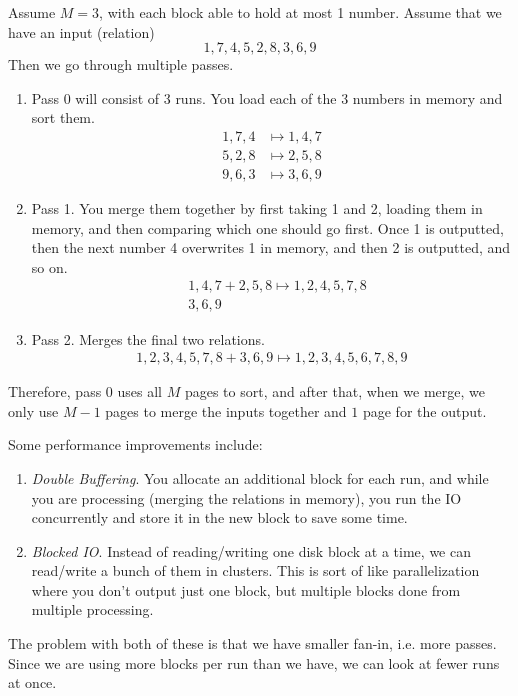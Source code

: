     \begin{example}
      \label{ex:baby-merge}
      Assume $M = 3$, with each block able to hold at most 1 number. Assume that we have an input (relation) 
      \begin{equation}
        1, 7, 4, 5, 2, 8, 3, 6, 9
      \end{equation}
      Then we go through multiple passes. 
      \begin{enumerate}
        \item Pass 0 will consist of 3 runs. You load each of the 3 numbers in memory and sort them.  
          \begin{align}
            1, 7, 4 & \mapsto 1, 4, 7 \\ 
            5, 2, 8 & \mapsto 2, 5, 8 \\ 
            9, 6, 3 & \mapsto 3, 6, 9
          \end{align}

        \item Pass 1. You merge them together by first taking 1 and 2, loading them in memory, and then comparing which one should go first. Once 1 is outputted, then the next number 4 overwrites 1 in memory, and then 2 is outputted, and so on. 
          \begin{align}
            & 1, 4, 7 + 2, 5, 8 \mapsto 1, 2, 4, 5, 7, 8 \\ 
            & 3, 6, 9
          \end{align}

        \item Pass 2. Merges the final two relations. 
          \begin{align}
            1, 2, 3, 4, 5, 7, 8 + 3, 6, 9 \mapsto 1, 2, 3, 4, 5, 6, 7, 8, 9
          \end{align}
      \end{enumerate}
      Therefore, pass 0 uses all $M$ pages to sort, and after that, when we merge, we only use $M-1$ pages to merge the inputs together and $1$ page for the output. 
    \end{example}

    Some performance improvements include: 
    \begin{enumerate}
      \item \textit{Double Buffering}. You allocate an additional block for each run, and while you are processing (merging the relations in memory), you run the IO concurrently and store it in the new block to save some time. 
      \item \textit{Blocked IO}. Instead of reading/writing one disk block at a time, we can read/write a bunch of them in clusters. This is sort of like parallelization where you don't output just one block, but multiple blocks done from multiple processing. 
    \end{enumerate}
    The problem with both of these is that we have smaller fan-in, i.e. more passes. Since we are using more blocks per run than we have, we can look at fewer runs at once. 

